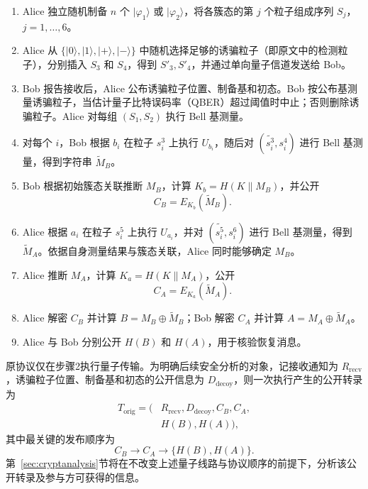\documentclass[UTF8,10pt,a4paper]{ctexart}
\theoremstyle{aqdplain}
\newcommand{\concat}{\mathbin{\|}}
\begin{document}
\begin{enumerate}[leftmargin=*,label=\textbf{步骤 \arabic*.}]
  \item Alice 独立随机制备 $n$ 个 $|\varphi_1\rangle$ 或 $|\varphi_2\rangle$，将各簇态的第 $j$ 个粒子组成序列 $S_j$，$j=1,\ldots,6$。
  \item Alice 从 $\{|0\rangle,|1\rangle,|+\rangle,|-\rangle\}$ 中随机选择足够的诱骗粒子（即原文中的检测粒子），分别插入 $S_3$ 和 $S_4$，得到 $S'_3,S'_4$，并通过单向量子信道发送给 Bob。
  \item Bob 报告接收后，Alice 公布诱骗粒子位置、制备基和初态。Bob 按公布基测量诱骗粒子，当估计量子比特误码率（QBER）超过阈值时中止；否则删除诱骗粒子。Alice 对每组 $(S_1,S_2)$ 执行 Bell 基测量。
  \item 对每个 $i$，Bob 根据 $b_i$ 在粒子 $s_i^3$ 上执行 $U_{b_i}$，随后对 $(\widetilde{s_i^3},s_i^4)$ 进行 Bell 基测量，得到字符串 $\widetilde M_B$。
  \item Bob 根据初始簇态关联推断 $M_B$，计算 $K_b=H(K\concat M_B)$，并公开
  \begin{equation}
      C_B=E_{K_b}(\widetilde M_B).
      \label{eq:orig-cb}
  \end{equation}
  \item Alice 根据 $a_i$ 在粒子 $s_i^5$ 上执行 $U_{a_i}$，并对 $(\widetilde{s_i^5},s_i^6)$ 进行 Bell 基测量，得到 $\widetilde M_A$。依据自身测量结果与簇态关联，Alice 同时能够确定 $M_B$。
  \item Alice 推断 $M_A$，计算 $K_a=H(K\concat M_A)$，公开
  \begin{equation}
      C_A=E_{K_a}(\widetilde M_A).
      \label{eq:orig-ca}
  \end{equation}
  \item Alice 解密 $C_B$ 并计算 $B=M_B\oplus\widetilde M_B$；Bob 解密 $C_A$ 并计算 $A=M_A\oplus\widetilde M_A$。
  \item Alice 与 Bob 分别公开 $H(B)$ 和 $H(A)$，用于核验恢复消息。
\end{enumerate}

原协议仅在步骤2执行量子传输。为明确后续安全分析的对象，记接收通知为 $R_{\mathrm{recv}}$，诱骗粒子位置、制备基和初态的公开信息为 $D_{\mathrm{decoy}}$，则一次执行产生的公开转录为
\begin{equation}
\begin{aligned}
T_{\mathrm{orig}}=(&R_{\mathrm{recv}},D_{\mathrm{decoy}},C_B,C_A,\\
&H(B),H(A)),
\end{aligned}
\label{eq:orig-transcript}
\end{equation}
其中最关键的发布顺序为
\begin{equation}
C_B\longrightarrow C_A\longrightarrow\{H(B),H(A)\}.
\label{eq:orig-release-order}
\end{equation}
第~\ref{sec:cryptanalysis}节将在不改变上述量子线路与协议顺序的前提下，分析该公开转录及参与方可获得的信息。
\end{document}
